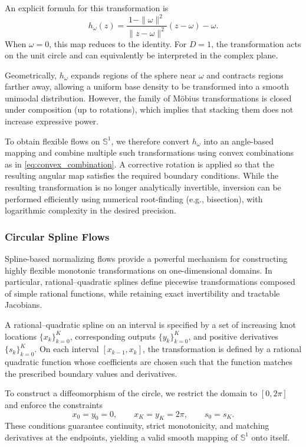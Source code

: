 \documentclass{article}
\begin{document}
An explicit formula for this transformation is
\begin{equation}
h_\omega(z) = \frac{1 - \|\omega\|^2}{\|z - \omega\|^2} (z - \omega) - \omega.
\end{equation}
When $\omega = 0$, this map reduces to the identity. For $D=1$, the transformation acts on the unit circle and can equivalently be interpreted in the complex plane.

Geometrically, $h_\omega$ expands regions of the sphere near $\omega$ and contracts regions farther away, allowing a uniform base density to be transformed into a smooth unimodal distribution. However, the family of Möbius transformations is closed under composition (up to rotations), which implies that stacking them does not increase expressive power.

To obtain flexible flows on $\mathbb{S}^1$, we therefore convert $h_\omega$ into an angle-based mapping and combine multiple such transformations using convex combinations as in \eqref{eq:convex_combination}. A corrective rotation is applied so that the resulting angular map satisfies the required boundary conditions. While the resulting transformation is no longer analytically invertible, inversion can be performed efficiently using numerical root-finding (e.g., bisection), with logarithmic complexity in the desired precision.

\subsubsection{Circular Spline Flows}\label{sec:circular_splines}

Spline-based normalizing flows provide a powerful mechanism for constructing highly flexible monotonic transformations on one-dimensional domains. In particular, rational--quadratic splines define piecewise transformations composed of simple rational functions, while retaining exact invertibility and tractable Jacobians.

A rational--quadratic spline on an interval is specified by a set of increasing knot locations $\{x_k\}_{k=0}^K$, corresponding outputs $\{y_k\}_{k=0}^K$, and positive derivatives $\{s_k\}_{k=0}^K$. On each interval $[x_{k-1}, x_k]$, the transformation is defined by a rational quadratic function whose coefficients are chosen such that the function matches the prescribed boundary values and derivatives.

To construct a diffeomorphism of the circle, we restrict the domain to $[0, 2\pi]$ and enforce the constraints
\[
x_0 = y_0 = 0, \qquad x_K = y_K = 2\pi, \qquad s_0 = s_K.
\]
These conditions guarantee continuity, strict monotonicity, and matching derivatives at the endpoints, yielding a valid smooth mapping of $\mathbb{S}^1$ onto itself.
\end{document}

